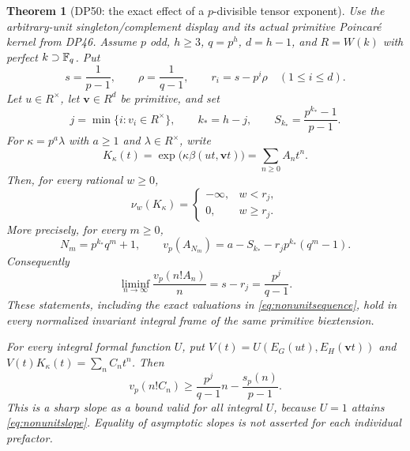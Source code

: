 \documentclass[11pt,a4paper]{article}
\newtheorem{theorem}{Theorem}[section]
\theoremstyle{definition}\newtheorem{remark}[theorem]{Remark}
\newcommand{\vp}{v_p}\newcommand{\dR}{\mathrm{dR}}\newcommand{\crys}{\mathrm{crys}}
\begin{document}
\begin{theorem}[DP50: the exact effect of a $p$-divisible tensor exponent]\label{DP50}
Use the arbitrary-unit singleton/complement display and its actual primitive Poincar\'e kernel from DP46. Assume $p$ odd, $h\ge3$, $q=p^h$, $d=h-1$, and $R=W(k)$ with perfect $k\supset\mathbb F_q$. Put
\[
 s=\frac1{p-1},\qquad \rho=\frac1{q-1},\qquad
 r_i=s-p^i\rho\quad(1\le i\le d).
\]
Let $u\in R^\times$, let $\mathbf v\in R^d$ be primitive, and set
\[
 j=\min\{i:v_i\in R^\times\},\qquad
 k_*=h-j,\qquad S_{k_*}=\frac{p^{k_*}-1}{p-1}.
\]
For $\kappa=p^a\lambda$ with $a\ge1$ and $\lambda\in R^\times$, write
\[
 K_\kappa(t)=\exp\bigl(\kappa\beta(ut,\mathbf vt)\bigr)
       =\sum_{n\ge0}A_nt^n.
\]
Then, for every rational $w\ge0$,
\begin{equation}\label{eq:nonunitradius}
 \nu_w(K_\kappa)=
 \begin{cases}-\infty,&w<r_j,\\0,&w\ge r_j.\end{cases}
\end{equation}
More precisely, for every $m\ge0$,
\begin{equation}\label{eq:nonunitsequence}
 N_m=p^{k_*}q^m+1,\qquad
 \vp(A_{N_m})=a-S_{k_*}-r_jp^{k_*}(q^m-1).
\end{equation}
Consequently
\begin{equation}\label{eq:nonunitslope}
 \liminf_{n\to\infty}\frac{\vp(n!A_n)}n
       =s-r_j=\frac{p^j}{q-1}.
\end{equation}
These statements, including the exact valuations in
\eqref{eq:nonunitsequence}, hold in every normalized invariant integral frame of the same primitive biextension.

For every integral formal function $U$, put
$V(t)=U(E_G(ut),E_H(\mathbf vt))$ and
$V(t)K_\kappa(t)=\sum_n C_nt^n$. Then
\begin{equation}\label{eq:nonunitprefactor}
 \vp(n!C_n)\ge\frac{p^j}{q-1}n-\frac{s_p(n)}{p-1}.
\end{equation}
This is a sharp slope as a bound valid for all integral $U$, because $U=1$ attains \eqref{eq:nonunitslope}. Equality of asymptotic slopes is not asserted for each individual prefactor.
\end{theorem}
\end{document}
